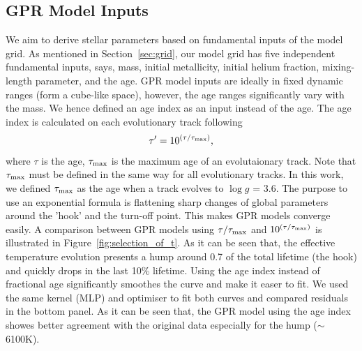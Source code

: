 \subsection{GPR Model Inputs}
We aim to derive stellar parameters based on fundamental inputs of the model grid. As mentioned in Section~\ref{sec:grid}, our model grid has five independent fundamental inputs, says, mass, initial metallicity, initial helium fraction, mixing-length parameter, and the age.
GPR model inputs are ideally in fixed dynamic ranges (form a cube-like space), however, the age ranges significantly vary with the mass. We hence defined an age index as an input instead of the age. The age index is calculated on each evolutionary track following 
\begin{equation}
 \tau' = 10^{(\tau/\tau_{\rm max})},
\end{equation}
where $\tau$ is the age, $\tau_{\rm max}$ is the maximum age of an evolutaionary track. Note that $\tau_{\rm max}$ must be defined in the same way for all evolutionary tracks. In this work, we defined $\tau_{\rm max}$ as the age when a track evolves to $\log g$ = 3.6. The purpose to use an exponential formula is flattening sharp changes of global parameters around the 'hook' and the turn-off point. This makes GPR models converge easily. A comparison between GPR models using $\tau/\tau_{\rm max}$ and $10^{(\tau/\tau_{\rm max})}$ is illustrated in Figure~\ref{fig:selection_of_t}.  As it can be seen that, the effective temperature evolution presents a hump around 0.7 of the total lifetime (the hook) and quickly drops in the last 10\% lifetime. Using the age index instead of fractional age significantly smoothes the curve and make it easer to fit. We used the same kernel (MLP) and optimiser to fit both curves and compared residuals in the bottom panel. As it can be seen that, the GPR model using the age index showes better agreement with the original data especially for the hump ($\sim$6100K).

